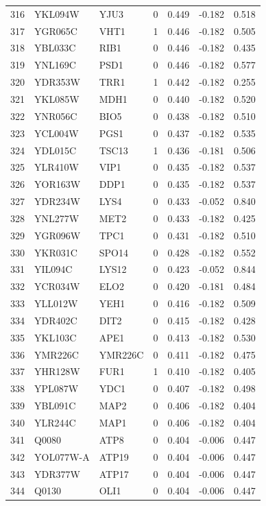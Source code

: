 \begin{longtable}{rllrrrr}
316 & YKL094W & YJU3 & 0 & 0.449 & -0.182 & 0.518\\
317 & YGR065C & VHT1 & 1 & 0.446 & -0.182 & 0.505\\
318 & YBL033C & RIB1 & 0 & 0.446 & -0.182 & 0.435\\
319 & YNL169C & PSD1 & 0 & 0.446 & -0.182 & 0.577\\
320 & YDR353W & TRR1 & 1 & 0.442 & -0.182 & 0.255\\
321 & YKL085W & MDH1 & 0 & 0.440 & -0.182 & 0.520\\
322 & YNR056C & BIO5 & 0 & 0.438 & -0.182 & 0.510\\
323 & YCL004W & PGS1 & 0 & 0.437 & -0.182 & 0.535\\
324 & YDL015C & TSC13 & 1 & 0.436 & -0.181 & 0.506\\
325 & YLR410W & VIP1 & 0 & 0.435 & -0.182 & 0.537\\
326 & YOR163W & DDP1 & 0 & 0.435 & -0.182 & 0.537\\
327 & YDR234W & LYS4 & 0 & 0.433 & -0.052 & 0.840\\
328 & YNL277W & MET2 & 0 & 0.433 & -0.182 & 0.425\\
329 & YGR096W & TPC1 & 0 & 0.431 & -0.182 & 0.510\\
330 & YKR031C & SPO14 & 0 & 0.428 & -0.182 & 0.552\\
331 & YIL094C & LYS12 & 0 & 0.423 & -0.052 & 0.844\\
332 & YCR034W & ELO2 & 0 & 0.420 & -0.181 & 0.484\\
333 & YLL012W & YEH1 & 0 & 0.416 & -0.182 & 0.509\\
334 & YDR402C & DIT2 & 0 & 0.415 & -0.182 & 0.428\\
335 & YKL103C & APE1 & 0 & 0.413 & -0.182 & 0.530\\
336 & YMR226C & YMR226C & 0 & 0.411 & -0.182 & 0.475\\
337 & YHR128W & FUR1 & 1 & 0.410 & -0.182 & 0.405\\
338 & YPL087W & YDC1 & 0 & 0.407 & -0.182 & 0.498\\
339 & YBL091C & MAP2 & 0 & 0.406 & -0.182 & 0.404\\
340 & YLR244C & MAP1 & 0 & 0.406 & -0.182 & 0.404\\
341 & Q0080 & ATP8 & 0 & 0.404 & -0.006 & 0.447\\
342 & YOL077W-A & ATP19 & 0 & 0.404 & -0.006 & 0.447\\
343 & YDR377W & ATP17 & 0 & 0.404 & -0.006 & 0.447\\
344 & Q0130 & OLI1 & 0 & 0.404 & -0.006 & 0.447\\

\end{longtable}
